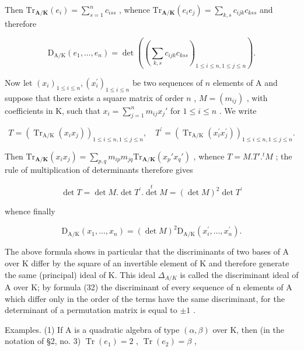 Then \(\mathrm{Tr}_{\mathbf{A} / \mathbf{K}}(e_i) = \sum_{s=1}^{n} c_{iss}\) , whence \(\mathrm{Tr}_{\mathbf{A} / \mathbf{K}}(e_i e_j) = \sum_{k,s} c_{ijk} c_{kss}\) and therefore

\[
\mathrm{D} _ {\mathrm{A} / \mathrm{K}} (e _ {1}, \dots , e _ {n}) = \det \left(\left(\sum_ {k, s} c _ {i j k} c _ {k s s}\right) _ {1 \leqslant i \leqslant n, 1 \leqslant j \leqslant n}\right).\tag{31}
\]

Now let \((x_{i})_{1\leqslant i\leqslant n},(x_{i}^{\prime})_{1\leqslant i\leqslant n}\) be two sequences of \(n\) elements of A and suppose that there exists a square matrix of order \(n\) , \(M = (m_{ij})\) , with coefficients in K, such that \(x_{i} = \sum_{j=1}^{n} m_{ij} x_{j}'\) for \(1 \leqslant i \leqslant n\) . We write

\[
T = \left(\operatorname{Tr} _ {\mathrm{A} / \mathrm{K}} \left(x _ {i} x _ {j}\right)\right) _ {1 \leqslant i \leqslant n, 1 \leqslant j \leqslant n}, \quad T ^ {\prime} = \left(\operatorname{Tr} _ {\mathrm{A} / \mathrm{K}} \left(x _ {i} ^ {\prime} x _ {j} ^ {\prime}\right)\right) _ {1 \leqslant i \leqslant n, 1 \leqslant j \leqslant n}.
\]

Then \(\mathrm{Tr}_{\mathbf{A} / \mathbf{K}}(x_i x_j) = \sum_{p,q} m_{ip} m_{jq} \mathrm{Tr}_{\mathbf{A} / \mathbf{K}}(x_p' x_q')\) , whence \(T = M. T'.^t M\) ; the rule of multiplication of determinants therefore gives

\[
\det T = \det M. \det T ^ {\prime}. \det ^ {t} M = (\det M) ^ {2} \det T ^ {\prime}
\]

whence finally

\[
\mathrm{D} _ {\mathrm{A} / \mathrm{K}} (x _ {1}, \dots , x _ {n}) = (\det M) ^ {2} \mathrm{D} _ {\mathrm{A} / \mathrm{K}} (x _ {i} ^ {\prime}, \dots , x _ {n} ^ {\prime}).\tag{32}
\]

The above formula shows in particular that the discriminants of two bases of A over K differ by the square of an invertible element of K and therefore generate the same (principal) ideal of K. This ideal \(\Delta_{A/K}\) is called the discriminant ideal of A over K; by formula (32) the discriminant of every sequence of n elements of A which differ only in the order of the terms have the same discriminant, for the determinant of a permutation matrix is equal to \(\pm1\) .

Examples. (1) If A is a quadratic algebra of type \((\alpha, \beta)\) over K, then (in the notation of §2, no. 3) \(\operatorname{Tr}(e_1) = 2\) , \(\operatorname{Tr}(e_2) = \beta\) ,

